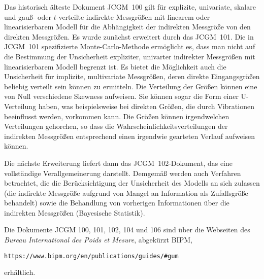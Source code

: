 Das historisch älteste Dokument JCGM~100 gilt für explizite, univariate, skalare und
gauß- oder $t$-verteilte indirekte Messgrößen mit linearem oder linearisierbarem Modell für die
Abhängigkeit der indirekten Messgröße von den direkten Messgrößen. Es wurde zunächst erweitert durch das JCGM~101. Die
in JCGM~101 spezifizierte Monte-Carlo-Methode ermöglicht es, dass man nicht auf die Bestimmung der Unsicherheit
expliziter, univarter indirekter Messgrößen mit linearisierbarem Modell begrenzt ist.
Es bietet die Möglichkeit auch die Unsicherheit für implizite, multivariate Messgrößen,
deren direkte Eingangsgrößen beliebig verteilt sein können zu ermitteln. Die Verteilung der
Größen können eine von Null verschiedene Skewness aufweisen. Sie können sogar die Form einer
U-Verteilung haben, was beispielsweise bei direkten Größen, die durch Vibrationen beeinflusst
werden, vorkommen kann. Die Größen können irgendwelchen Verteilungen gehorchen, so dass die
Wahrscheinlichkeitsverteilungen der indirekten Messgrößen entsprechend einen
irgendwie gearteten Verlauf aufweisen können.

Die nächste Erweiterung liefert dann das JCGM~102-Dokument, das eine vollständige Verallgemeinerung
darstellt. Demgemäß werden auch Verfahren betrachtet, die die Berücksichtigung der Unsicherheit des Modells an sich
zulassen (die indirekte Messgröße aufgrund von Mangel an Information als Zufallsgröße behandelt)
sowie die Behandlung von vorherigen Informationen über die indirekten Messgrößen (Bayesische Statistik).

Die Dokumente JCGM 100, 101, 102, 104 und 106 sind über die Webseiten des
\textsl{Bureau International des Poids et Mesure}, abgekürzt BIPM,
\begin{verbatim}
https://www.bipm.org/en/publications/guides/#gum
\end{verbatim}
erhältlich.

